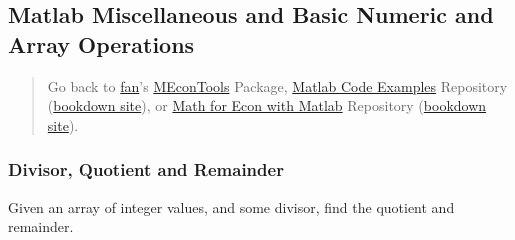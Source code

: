 \documentclass[
]{book}
\begin{document}
\hypertarget{matlab-miscellaneous-and-basic-numeric-and-array-operations}{%
\subsection{Matlab Miscellaneous and Basic Numeric and Array Operations}\label{matlab-miscellaneous-and-basic-numeric-and-array-operations}}

\begin{quote}
Go back to \href{http://fanwangecon.github.io/}{fan}'s \href{https://fanwangecon.github.io/MEconTools/}{MEconTools} Package, \href{https://fanwangecon.github.io/M4Econ/}{Matlab Code Examples} Repository (\href{https://fanwangecon.github.io/M4Econ/bookdown}{bookdown site}), or \href{https://fanwangecon.github.io/Math4Econ/}{Math for Econ with Matlab} Repository (\href{https://fanwangecon.github.io/Math4Econ/bookdown}{bookdown site}).
\end{quote}

\hypertarget{divisor-quotient-and-remainder}{%
\subsubsection{Divisor, Quotient and Remainder}\label{divisor-quotient-and-remainder}}

Given an array of integer values, and some divisor, find the quotient
and remainder.
\end{document}
